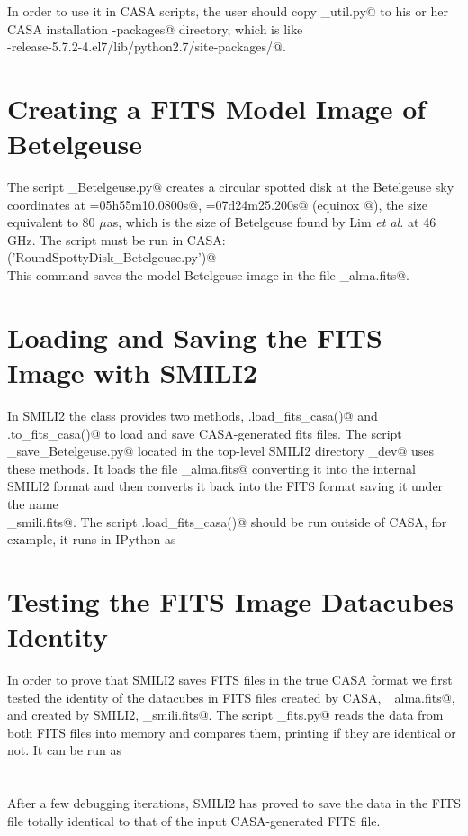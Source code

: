 \documentclass[preprint]{aastex}
\begin{document}
In order to use it in CASA scripts, the user should copy \verb@alma_util.py@ to his or her CASA installation \verb@site-packages@ directory, which is like \\
\verb@casa-release-5.7.2-4.el7/lib/python2.7/site-packages/@.


\section{Creating a FITS Model Image of Betelgeuse}

The script \verb@RoundSpottyDisk_Betelgeuse.py@ creates a circular spotted disk at the Betelgeuse sky coordinates at  \verb@RA=05h55m10.0800s@, \verb@DEC=07d24m25.200s@ (equinox @), the size equivalent to 80 $\mu$as, which is the size of Betelgeuse found by Lim \emph{et al.} at 46 GHz. The script must be run in CASA: \\
\verb@execfile('RoundSpottyDisk_Betelgeuse.py')@ \\
This command saves the model Betelgeuse image in the file \verb@RoundSpottyDisk_alma.fits@.


\section{Loading and Saving the FITS Image with SMILI2}

In SMILI2 the class \verb@imdata@ provides two methods, \verb@imdata.load_fits_casa()@ and \\ \verb@imdata.to_fits_casa()@ to load and save CASA-generated fits files. The script \\
\verb@load_save_Betelgeuse.py@ located in the top-level SMILI2 directory _dev@ uses these methods. It loads the file \verb@RoundSpottyDisk_alma.fits@ converting it into the internal SMILI2 format and then converts it back into the FITS format saving it under the name \\
\verb@RoundSpottyDisk_smili.fits@. The script \verb@imdata.load_fits_casa()@ should be run outside of CASA, for example, it runs in IPython as \\
\verb@%run load_save_Betelgeuse.py @


\section{Testing the FITS Image Datacubes Identity}

In order to prove that SMILI2 saves FITS files in the true CASA format we first tested the identity of the datacubes in FITS files created by CASA, \verb@RoundSpottyDisk_alma.fits@, and created by SMILI2, \verb@RoundSpottyDisk_smili.fits@. The script \verb@diff_fits.py@ reads the data from both FITS files into memory and compares them, printing if they are identical or not. It can be run as \\
\\
\verb@%run diff_fits.py@ \\
\\
After a few debugging iterations, SMILI2 has proved to save the data in the FITS file totally identical to that of the input CASA-generated FITS file.
\end{document}
